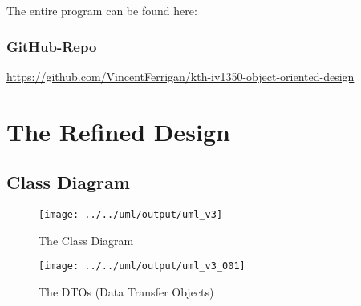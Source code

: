 \documentclass[a4paper]{scrreprt}
\begin{document}
The entire program can be found here:

\subsubsection*{GitHub-Repo}
\url{https://github.com/VincentFerrigan/kth-iv1350-object-oriented-design}

%
\newpage
    \section*{The Refined Design}
    \subsection*{Class Diagram}

    \begin{figure}[h!]
        \begin{center}
            \texttt{[image: ../../uml/output/uml\_v3]}
            \caption{The Class Diagram}
            \label{fig:CD}
        \end{center}
    \end{figure}

    \begin{figure}[h!]
        \begin{center}
            \texttt{[image: ../../uml/output/uml\_v3\_001]}
            \caption{The DTOs (Data Transfer Objects)}
            \label{fig:DTO}
        \end{center}
    \end{figure}
\end{document}

